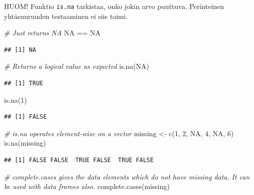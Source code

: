 \documentclass[
]{book}
\newenvironment{Shaded}{\begin{snugshade}}{\end{snugshade}}
\newcommand{\CommentTok}[1]{\textcolor[rgb]{0.56,0.35,0.01}{\textit{#1}}}
\newcommand{\ConstantTok}[1]{\textcolor[rgb]{0.00,0.00,0.00}{#1}}
\newcommand{\DecValTok}[1]{\textcolor[rgb]{0.00,0.00,0.81}{#1}}
\newcommand{\FunctionTok}[1]{\textcolor[rgb]{0.00,0.00,0.00}{#1}}
\newcommand{\NormalTok}[1]{#1}
\newcommand{\OtherTok}[1]{\textcolor[rgb]{0.56,0.35,0.01}{#1}}
\newcommand{\SpecialCharTok}[1]{\textcolor[rgb]{0.00,0.00,0.00}{#1}}
\begin{document}
HUOM! Funktio \texttt{is.na} tarkistaa, onko jokin arvo puuttuva. Perinteinen yhtäsuuruuden testaaminen ei siis toimi.

\begin{Shaded}
\begin{Highlighting}[]
\CommentTok{\# Just returns NA}
\ConstantTok{NA} \SpecialCharTok{==} \ConstantTok{NA}
\end{Highlighting}
\end{Shaded}

\begin{verbatim}
## [1] NA
\end{verbatim}

\begin{Shaded}
\begin{Highlighting}[]
\CommentTok{\# Returns a logical value as expected}
\FunctionTok{is.na}\NormalTok{(}\ConstantTok{NA}\NormalTok{)}
\end{Highlighting}
\end{Shaded}

\begin{verbatim}
## [1] TRUE
\end{verbatim}

\begin{Shaded}
\begin{Highlighting}[]
\FunctionTok{is.na}\NormalTok{(}\DecValTok{1}\NormalTok{)}
\end{Highlighting}
\end{Shaded}

\begin{verbatim}
## [1] FALSE
\end{verbatim}

\begin{Shaded}
\begin{Highlighting}[]
\CommentTok{\# is.na operates element{-}wise on a vector}
\NormalTok{missing }\OtherTok{\textless{}{-}} \FunctionTok{c}\NormalTok{(}\DecValTok{1}\NormalTok{, }\DecValTok{2}\NormalTok{, }\ConstantTok{NA}\NormalTok{, }\DecValTok{4}\NormalTok{, }\ConstantTok{NA}\NormalTok{, }\DecValTok{6}\NormalTok{)}
\FunctionTok{is.na}\NormalTok{(missing)}
\end{Highlighting}
\end{Shaded}

\begin{verbatim}
## [1] FALSE FALSE  TRUE FALSE  TRUE FALSE
\end{verbatim}

\begin{Shaded}
\begin{Highlighting}[]
\CommentTok{\# complete.cases gives the data elements which do not have missing data. It can be used with data frames also.}
\FunctionTok{complete.cases}\NormalTok{(missing)}
\end{Highlighting}
\end{Shaded}
\end{document}
